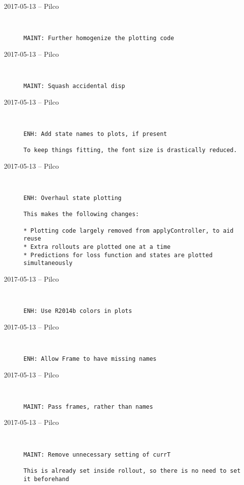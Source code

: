 \begin{description}
  \item[2017-05-13 -- Pilco] \hfill \
\begin{lstlisting}
MAINT: Further homogenize the plotting code
\end{lstlisting}


  \item[2017-05-13 -- Pilco] \hfill \
\begin{lstlisting}
MAINT: Squash accidental disp
\end{lstlisting}


  \item[2017-05-13 -- Pilco] \hfill \
\begin{lstlisting}
ENH: Add state names to plots, if present

To keep things fitting, the font size is drastically reduced.
\end{lstlisting}


  \item[2017-05-13 -- Pilco] \hfill \
\begin{lstlisting}
ENH: Overhaul state plotting

This makes the following changes:

* Plotting code largely removed from applyController, to aid reuse
* Extra rollouts are plotted one at a time
* Predictions for loss function and states are plotted simultaneously
\end{lstlisting}


  \item[2017-05-13 -- Pilco] \hfill \
\begin{lstlisting}
ENH: Use R2014b colors in plots
\end{lstlisting}


  \item[2017-05-13 -- Pilco] \hfill \
\begin{lstlisting}
ENH: Allow Frame to have missing names
\end{lstlisting}


  \item[2017-05-13 -- Pilco] \hfill \
\begin{lstlisting}
MAINT: Pass frames, rather than names
\end{lstlisting}


  \item[2017-05-13 -- Pilco] \hfill \
\begin{lstlisting}
MAINT: Remove unnecessary setting of currT

This is already set inside rollout, so there is no need to set it beforehand
\end{lstlisting}



\end{description}
